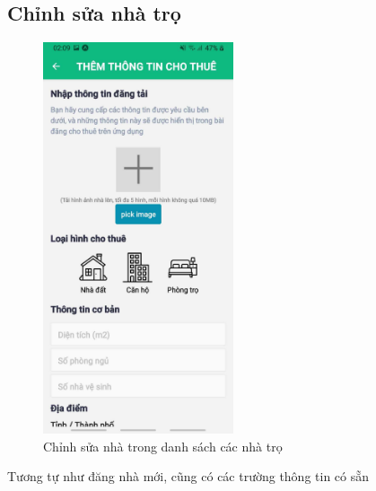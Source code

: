 \subsection{Chỉnh sửa nhà trọ}
\begin{figure}[H]
    \centering
    \includegraphics[width=0.5\textwidth]{Images/app_image/app_2.jpg}
    \caption{Chỉnh sửa nhà trong danh sách các nhà trọ}
\end{figure}
Tương tự như đăng nhà mới, cũng có các trường thông tin có sẵn
